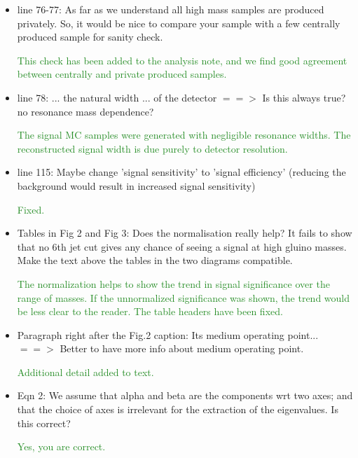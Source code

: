 \documentclass[paper=a4, fontsize=11pt]{scrartcl}
\begin{document}
\begin{itemize}
\item line 76-77: As far as we understand all high mass samples are produced privately. So, it would be nice to compare your sample with a few centrally produced sample for sanity check.

\textcolor{ForestGreen}{This check has been added to the analysis note, and we find good agreement between 
centrally and private produced samples.}

\item line 78: ... the natural width ... of the detector $==>$ Is this always true? no resonance mass dependence?

\textcolor{ForestGreen}{The signal MC samples were generated with negligible
resonance widths. The reconstructed signal width is due purely to 
detector resolution.}\\


\item line 115: Maybe change 'signal sensitivity' to 'signal efficiency' (reducing the background would result in increased signal sensitivity)

\textcolor{ForestGreen}{Fixed.}\\

\item Tables in Fig 2 and Fig 3: Does the normalisation really help? It fails to show that no 6th jet cut gives any chance of seeing a signal at high gluino masses. Make the text above the tables in the two diagrams compatible.

\textcolor{ForestGreen}{The normalization helps to
show the trend in signal significance over the range of masses. If the
unnormalized significance was shown, the trend would be less clear to the reader. The table headers have been fixed.}\\

\item Paragraph right after the Fig.2 caption: Its medium operating point... $==>$ Better to have more info about medium operating point.

\textcolor{ForestGreen}{Additional detail added to text.}\\

\item Eqn 2: We assume that alpha and beta are the components wrt two axes; and that the choice of axes is irrelevant for the extraction of the eigenvalues. Is this correct?

\textcolor{ForestGreen}{Yes, you are correct.}\\


\end{itemize}
\end{document}
